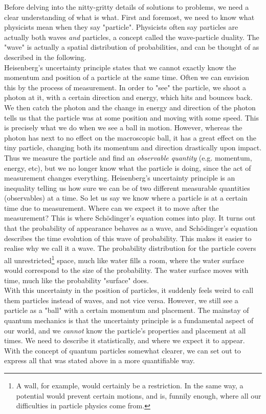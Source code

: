 \documentclass[10pt,twoside]{report}
\begin{document}
	Before delving into the nitty-gritty details of solutions to problems, we need a clear understanding of what is what. First and foremost, we need to know what physicists mean when they say "particle". Physicists often say particles are actually both waves \emph{and} particles, a concept called the wave-particle duality. The "wave" is actually a spatial distribution of probabilities, and can be thought of as described in the following.\\
	
	Heisenberg's uncertainty principle states that we cannot exactly know the momentum and position of a particle at the same time. Often we can envision this by the process of measurement. In order to "see" the particle, we shoot a photon at it, with a certain direction and energy, which hits and bounces back. We then catch the photon and the change in energy and direction of the photon tells us that the particle was at some position and moving with some speed. This is precisely what we do when we see a ball in motion. However, whereas the photon has next to no effect on the macroscopic ball, it has a great effect on the tiny particle, changing both its momentum and direction drastically upon impact. Thus we measure the particle and find an \emph{observable quantity} (e.g. momentum, energy, etc), but we no longer know what the particle is doing, since the act of measurement changes everything. Heisenberg's uncertainty principle is an inequality telling us how sure we can be of two different measurable quantities (observables) at a time. So let us say we know where a particle is at a certain time due to measurement. Where can we expect it to move after the measurement? This is where Sch\"odinger's equation comes into play. It turns out that the probability of appearance behaves as a wave, and Sch\"odinger's equation describes the time evolution of this wave of probability. This makes it easier to realise why we call it a wave. The probability distribution for the particle covers all unrestricted\footnote{A wall, for example, would certainly be a restriction. In the same way, a potential would prevent certain motions, and is, funnily enough, where all our difficulties in particle physics come from.} space, much like water fills a room, where the water surface would correspond to the size of the probability. The water surface moves with time, much like the probability "surface" does.\\
	
	With this uncertainty in the position of particles, it suddenly feels weird to call them particles instead of waves, and not vice versa. However, we still see a particle as a "ball" with a certain momentum and placement. The mainstay of quantum mechanics is that the uncertainty principle is a fundamental aspect of our world, and we \emph{cannot} know the particle's properties and placement at all times. We need to describe it statistically, and where we expect it to appear. With the concept of quantum particles somewhat clearer, we can set out to express all that was stated above in a more quantifiable way.
	
\end{document}

